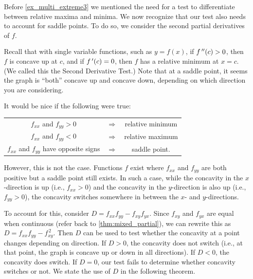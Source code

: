 Before \autoref{ex_multi_extreme3} we mentioned the need for a test to differentiate between relative maxima and minima. We now recognize that our test also needs to account for saddle points. To do so, we consider the second partial derivatives of $f$.

Recall that with single variable functions, such as $y=f(x)$, if $f\,''(c)>0$, then $f$ is concave up at $c$, and if $f\,'(c) =0$, then $f$ has a relative minimum at $x=c$. (We called this the Second Derivative Test.) Note that at a saddle point, it seems the graph is ``both'' concave up and concave down, depending on which direction you are considering.

It would be nice if the following were true:
\begin{center}
	\begin{tabular}{ c c c }
	$f_{xx}$ and $f_{yy} >0$ & $\Rightarrow$ & relative minimum\\
	$f_{xx}$ and $f_{yy} <0$ & $\Rightarrow$ & relative maximum\\
	$f_{xx}$ and $f_{yy}$ have opposite signs & $\Rightarrow$ & saddle point.
	\end{tabular}
\end{center}

However, this is not the case. Functions $f$ exist where $f_{xx}$ and $f_{yy}$ are both positive  but a saddle point still exists. In such a case, while the concavity in the $x$-direction is up (i.e., $f_{xx}>0$) and the concavity in the $y$-direction is also up (i.e., $f_{yy}>0$), the concavity switches somewhere in between the $x$- and $y$-directions.

To account for this, consider $D = f_{xx}f_{yy}-f_{xy}f_{yx}$. Since $f_{xy}$ and $f_{yx}$ are equal when continuous (refer back to \autoref{thm:mixed_partial}), we can rewrite this as $D = f_{xx}f_{yy}-f_{xy}^{\,2}$. Then $D$ can be used to test whether the concavity at a point changes depending on direction. If $D>0$, the concavity does not switch (i.e., at that point, the graph is concave up or down in all directions). If $D<0$, the concavity does switch. If $D=0$, our test fails to determine whether concavity switches or not. We state the use of $D$ in the following theorem.

